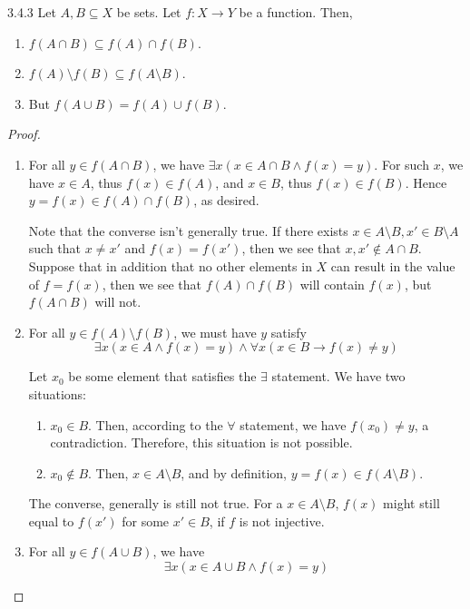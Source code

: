 \begin{exercise}{3.4.3}
	Let $A,B \subseteq X$ be sets. Let $f: X \to Y$ be a function. Then,
	\begin{enumerate}
		\item $f(A \cap B) \subseteq f(A) \cap f(B)$.
		\item $f(A) \setminus f(B) \subseteq f(A \setminus B)$.
		\item But $f(A \cup B) = f(A) \cup f(B)$.
	\end{enumerate}
\end{exercise}
\begin{proof}\leavevmode
	\begin{enumerate}
		\item For all $y \in f(A \cap B)$, we have $\exists x(x \in A \cap B \wedge f(x) = y)$. For such $x$, we have $x \in A$, thus $f(x) \in f(A)$, and $x \in B$, thus $f(x) \in f(B)$. Hence $y = f(x) \in f(A) \cap f(B)$, as desired.
		
		Note that the converse isn't generally true. If there exists $x \in A \setminus B, x' \in B \setminus A$ such that $x \ne x'$ and $f(x) = f(x')$, then we see that $x,x' \notin A \cap B$. Suppose that in addition that no other elements in $X$ can result in the value of $f = f(x)$, then we see that $f(A) \cap f(B)$ will contain $f(x)$, but $f(A \cap B)$ will not.
		
		\item For all $y \in f(A) \setminus f(B)$, we must have $y$ satisfy
		\[
		\exists x(x \in A \wedge f(x) = y) \wedge \forall x(x \in B \to f(x) \ne y)
		\]
		
		Let $x_0$ be some element that satisfies the $\exists$ statement. We have two situations:
		\begin{enumerate}
			\item $x_0 \in B$. Then, according to the $\forall$ statement, we have $f(x_0) \ne y$, a contradiction. Therefore, this situation is not possible.
			\item $x_0 \notin B$. Then, $x \in A \setminus B$, and by definition, $y = f(x) \in f(A \setminus B)$.
		\end{enumerate}
	
		The converse, generally is still not true. For a $x \in A \setminus B$, $f(x)$ might still equal to $f(x')$ for some $x' \in B$, if $f$ is not injective.
	
		\item For all $y \in f(A \cup B)$, we have
		\begin{equation}
			\exists x(x \in A \cup B \wedge f(x) = y) \label{eq.1.exer.3.4.3}
		\end{equation}
	

\end{enumerate}
\end{proof}
